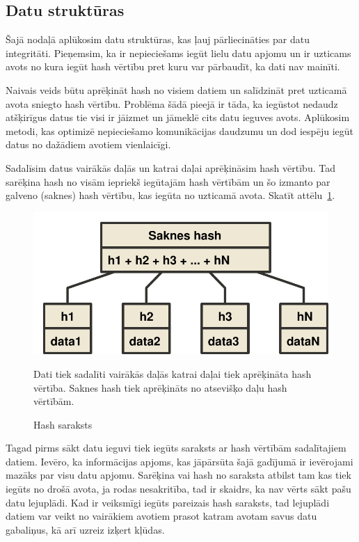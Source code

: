 \subsection{Datu struktūras}
Šajā nodaļā aplūkosim datu struktūras, kas ļauj pārliecināties par datu integritāti. Pieņemsim, ka ir nepieciešams iegūt lielu datu apjomu un ir uzticams avots no kura iegūt hash vērtību pret kuru var pārbaudīt, ka dati nav mainīti. 

Naivais veids būtu aprēķināt hash no visiem datiem un salīdzināt pret uzticamā avota sniegto hash vērtību. Problēma šādā pieejā ir tāda, ka iegūstot nedaudz atšķirīgus datus tie visi ir jāizmet un jāmeklē cits datu ieguves avots. Aplūkosim metodi, kas optimizē nepieciešamo komunikācijas daudzumu un dod iespēju iegūt datus no dažādiem avotiem vienlaicīgi.

Sadalīsim datus vairākās daļās un katrai daļai aprēķināsim hash vērtību. Tad sarēķina hash no visām iepriekš iegūtajām hash vērtībām un šo izmanto par galveno (saknes) hash vērtību, kas iegūta no uzticamā avota. Skatīt attēlu~\ref{fig:hash-list}.

\begin{figure}[htpb]
    \centering
    \includegraphics[scale=0.5]{teorija/hash-list.pdf}
    \caption{Hash saraksts}
    Dati tiek sadalīti vairākās daļās katrai daļai tiek aprēķināta hash vērtība. Saknes hash tiek aprēķināts no atsevišķo daļu hash vērtībām.
\label{fig:hash-list}
\end{figure}

Tagad pirms sākt datu ieguvi tiek iegūts saraksts ar hash vērtībām sadalītajiem datiem. Ievēro, ka informācijas apjoms, kas jāpārsūta šajā gadījumā ir ievērojami mazāks par visu datu apjomu. Sarēķina vai hash no saraksta atbilst tam kas tiek iegūts no drošā avota, ja rodas nesakritība, tad ir skaidrs, ka nav vērts sākt pašu datu lejuplādi. Kad ir veiksmīgi iegūts pareizais hash saraksts, tad lejuplādi datiem var veikt no vairākiem avotiem prasot katram avotam savus datu gabaliņus, kā arī uzreiz izķert kļūdas.

